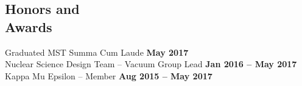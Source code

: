 \documentclass[margin,line]{resume}
\begin{document}
\begin{resume}
    \section{\mysidestyle Honors and\\Awards}
    Graduated MST Summa Cum Laude \hfill \textbf{May 2017}\\
    Nuclear Science Design Team – Vacuum Group Lead \hfill \textbf{Jan 2016 -- May 2017}\\
    Kappa Mu Epsilon – Member \hfill \textbf{Aug 2015 -- May 2017}\\



\end{resume}
\end{document}
